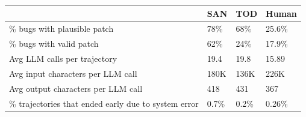 \begin{tabular}{@{}llll@{}}
\toprule
                                                     & SAN  & TOD  & Human \\ \midrule
\% bugs with plausible patch                         & 78\% & 68\% & 25.6\%  \\
\% bugs with valid patch                             & 62\% & 24\% & 17.9\%  \\
Avg LLM calls per trajectory                         & 19.4   & 19.8 & 15.89  \\
Avg input characters per LLM call                    & 180K & 136K & 226K \\
Avg output characters per LLM call                   & 418  & 431  & 367   \\
\% trajectories that ended early due to system error & 0.7\%  & 0.2\% & 0.26\% \\ \bottomrule
\end{tabular}%
